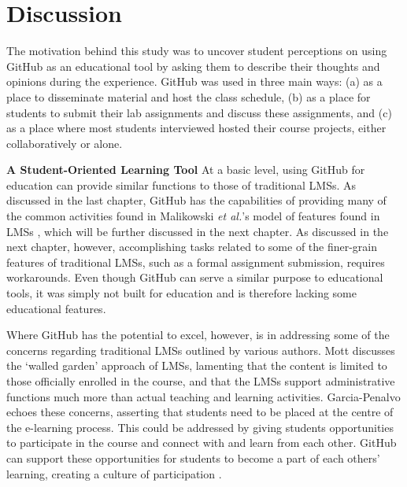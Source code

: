 

\section{Discussion}
The motivation behind this study was to uncover student perceptions on using GitHub as an educational tool by asking them to describe their thoughts and opinions during the experience. GitHub was used in three main ways: (a) as a place to disseminate material and host the class schedule, (b) as a place for students to submit their lab assignments and discuss these assignments, and (c) as a place where most students interviewed hosted their course projects, either collaboratively or alone.

\textbf{A Student-Oriented Learning Tool}
At a basic level, using GitHub for education can provide similar functions to those of traditional LMSs. As discussed in the last chapter, GitHub has the capabilities of providing many of the common activities found in Malikowski \textit{et al.}'s model of features found in LMSs \cite{malikowski2007model}, which will be further discussed in the next chapter. As discussed in the next chapter, however, accomplishing tasks related to some of the finer-grain features of traditional LMSs, such as a formal assignment submission, requires workarounds. Even though GitHub can serve a similar purpose to educational tools, it was simply not built for education and is therefore lacking some educational features.

Where GitHub has the potential to excel, however, is in addressing some of the concerns regarding traditional LMSs outlined by various authors. Mott \cite{mott2010envisioning} discusses the `walled garden' approach of LMSs, lamenting that the content is limited to those officially enrolled in the course, and that the LMSs support administrative functions much more than actual teaching and learning activities. Garcia-Penalvo \cite{garcia2011opening} echoes these concerns, asserting that students need to be placed at the centre of the e-learning process. This could be addressed by giving students opportunities to participate in the course and connect with and learn from each other. GitHub can support these opportunities for students to become a part of each others' learning, creating a culture of participation \cite{jenkins2009confronting}. \\

